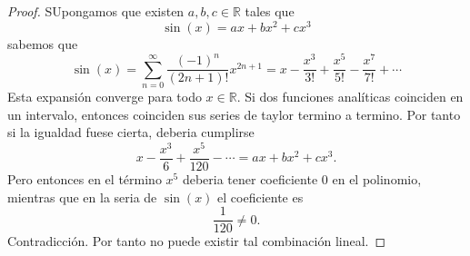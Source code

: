 \documentclass[12pt,a4paper]{article}
\begin{document}
    \begin{proof}
        SUpongamos que existen $a,b,c\in\mathbb{R}$ tales que
        \begin{equation*}
            \sin(x)=ax+bx^{2}+cx^{3}
        \end{equation*}
        sabemos que
        \begin{equation*}
            \sin(x)=\sum_{n=0}^{\infty}\frac{(-1)^{n}}{(2n+1)!}x^{2n+1}=x-\frac{x^{3}}{3!}+\frac{x^{5}}{5!}-\frac{x^{7}}{7!}+\cdots
        \end{equation*}
        Esta expansión converge para todo $x\in\mathbb{R}$. Si dos funciones analíticas coinciden en un intervalo,
        entonces coinciden sus series de taylor termino a termino. Por tanto si la igualdad fuese cierta, deberia cumplirse
        \begin{equation*}
            x-\frac{x^{3}}{6}+\frac{x^{5}}{120}-\cdots=ax+bx^{2}+cx^{3}.
        \end{equation*}
        Pero entonces en el término $x^{5}$ deberia tener coeficiente 0 en el polinomio,
        mientras que en la seria de $\sin(x)$ el coeficiente es
        \begin{equation*}
            \frac{1}{120}\neq0.
        \end{equation*}
        Contradicción. Por tanto no puede existir tal combinación lineal.
    \end{proof}
\end{document}
